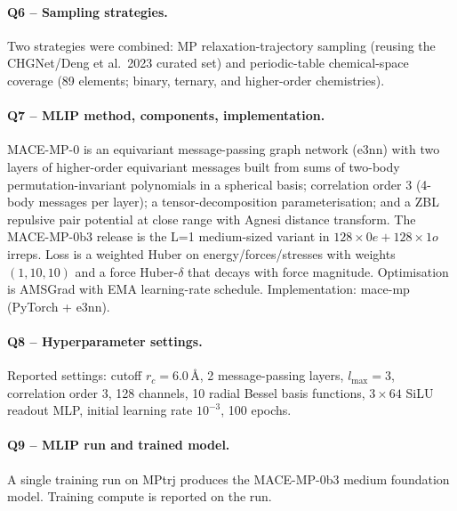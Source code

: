 \paragraph{Q6 -- Sampling strategies.}
Two strategies were combined: MP relaxation-trajectory sampling
(reusing the CHGNet/Deng et al.\ 2023 curated set) and periodic-table
chemical-space coverage (89 elements; binary, ternary, and
higher-order chemistries).


\paragraph{Q7 -- MLIP method, components, implementation.}
MACE-MP-0 is an equivariant message-passing graph network (e3nn) with
two layers of higher-order equivariant messages built from sums of
two-body permutation-invariant polynomials in a spherical basis;
correlation order 3 (4-body messages per layer); a tensor-decomposition
parameterisation; and a ZBL repulsive pair potential at close range
with Agnesi distance transform. The MACE-MP-0b3 release is the L=1
medium-sized variant in $128\!\times\!0e + 128\!\times\!1o$ irreps.
Loss is a weighted Huber on energy/forces/stresses with weights
$(1, 10, 10)$ and a force Huber-$\delta$ that decays with force
magnitude. Optimisation is AMSGrad with EMA learning-rate schedule.
Implementation: mace-mp (PyTorch + e3nn).


\paragraph{Q8 -- Hyperparameter settings.}
Reported settings: cutoff $r_c = 6.0$\,\AA, 2 message-passing layers,
$l_{\max}=3$, correlation order 3, 128 channels, 10 radial Bessel
basis functions, $3{\times}64$ SiLU readout MLP, initial learning rate
$10^{-3}$, 100 epochs.


\paragraph{Q9 -- MLIP run and trained model.}
A single training run on MPtrj produces the MACE-MP-0b3 medium
foundation model. Training compute is reported on the run.


